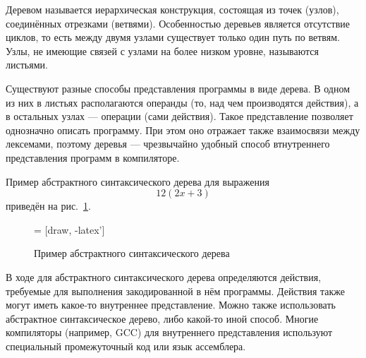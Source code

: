 Деревом называется иерархическая конструкция, состоящая из точек
(узлов), соединённых отрезками (ветвями). Особенностью деревьев
является отсутствие циклов, то есть между двумя узлами существует
только один путь по ветвям. Узлы, не имеющие связей с узлами на более
низком уровне, называются листьями.

Существуют разные способы представления программы в виде дерева. В
одном из них в листьях располагаются операнды (то, над чем
производятся действия), а в остальных узлах — операции (сами
действия). Такое представление позволяет однозначно описать
программу. При этом оно отражает также взаимосвязи между лексемами,
поэтому деревья — чрезвычайно удобный способ втнутреннего
представления программ в компиляторе.

Пример абстрактного синтаксического дерева для выражения
\[
12(2x+3)
\]
приведён на рис.~\ref{fig:ast}.

\begin{figure}
  \begin{centering}
     = [draw, -latex']
    
    \par
  \end{centering}

  \caption{Пример абстрактного синтаксического дерева\label{fig:ast}}
\end{figure}

В ходе  для
абстрактного синтаксического дерева определяются действия, требуемые
для выполнения закодированной в нём программы. Действия также могут
иметь какое-то внутреннее представление.  Можно также использовать
абстрактное синтаксическое дерево, либо какой-то иной способ. Многие
компиляторы (например, GCC) для внутреннего представления используют
специальный промежуточный код или язык ассемблера.

